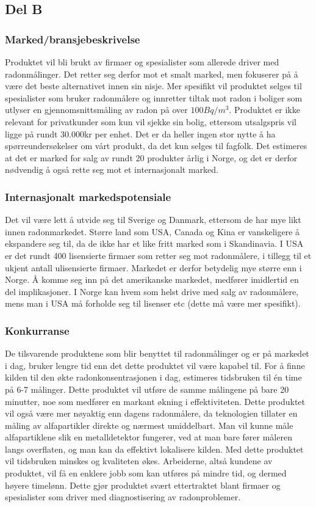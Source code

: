 \subsection{Del B}

\subsubsection{Marked/bransjebeskrivelse}

Produktet vil bli brukt av firmaer og spesialister som allerede driver med radonmålinger. Det retter seg derfor mot et smalt marked, men fokuserer på å være det beste alternativet innen sin nisje. Mer spesifikt vil produktet selges til spesialister som bruker radonmålere og innretter tiltak mot radon i boliger som utlyser en gjennomsnittsmåling av radon på over $100 Bq/m^3$. Produktet er ikke relevant for privatkunder som kun vil sjekke sin bolig, ettersom utsalgspris vil ligge på rundt 30.000kr per enhet. Det er da heller ingen stor nytte å ha spørreundersøkelser om vårt produkt, da det kun selges til fagfolk. Det estimeres at det er marked for salg av rundt 20 produkter årlig i Norge, og det er derfor nødvendig å også rette seg mot et internasjonalt marked.

\subsubsection{Internasjonalt markedspotensiale}
Det vil være lett å utvide seg til Sverige og Danmark, ettersom de har mye likt innen radonmarkedet. Større land som USA, Canada og Kina er vanskeligere å ekspandere seg til, da de ikke har et like fritt marked som i Skandinavia. I USA er det rundt 400 lisensierte firmaer som retter seg mot radonmålere, i tillegg til et ukjent antall ulisensierte firmaer. Markedet er derfor betydelig mye større enn i Norge. Å komme seg inn på det amerikanske markedet, medfører imidlertid en del implikasjoner. I Norge kan hvem som helst drive med salg av radonmålere, mens man i USA må forholde seg til lisenser etc (dette må være mer spesifikt).

\subsubsection{Konkurranse}
De tilsvarende produktene som blir benyttet til radonmålinger og er på markedet i dag, bruker lengre tid enn det dette produktet vil være kapabel til. For å finne kilden til den økte radonkonsentrasjonen i dag, estimeres tidsbruken til én time på 6-7 målinger. Dette produktet vil utføre de samme målingene på bare 20 minutter, noe som medfører en markant økning i effektiviteten. Dette produktet vil også være mer nøyaktig enn dagens radonmålere, da teknologien tillater en måling av alfapartikler direkte og nærmest umiddelbart. Man vil kunne måle alfapartiklene slik en metalldetektor fungerer, ved at man bare fører måleren langs overflaten, og man kan da effektivt lokalisere kilden. Med dette produktet vil tidsbruken minskes og kvaliteten økes. Arbeiderne, altså kundene av produktet, vil få en enklere jobb som kan utføres på mindre tid, og dermed høyere timelønn. Dette gjør produktet svært ettertraktet blant firmaer og spesialister som driver med diagnostisering av radonproblemer.


